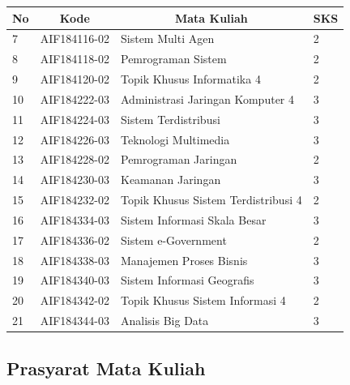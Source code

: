 \begin{table}[H]
	\centering
		\begin{tabular}{|p{0.5cm}|p{2.85cm}|p{4.95cm}|p{2.7cm}|}
			\hline
			\multicolumn{1}{|c|}{\textbf{No}} & \multicolumn{1}{c|}{\textbf{Kode}} & \multicolumn{1}{c|}{\textbf{Mata Kuliah}} & \multicolumn{1}{c|}{\textbf{SKS}} \\ \hline
7   & AIF184116-02    & Sistem Multi Agen                          & 2   \\ \hline
8   & AIF184118-02    & Pemrograman Sistem                         & 2   \\ \hline
9   & AIF184120-02    & Topik Khusus Informatika 4                 & 2   \\ \hline
10  & AIF184222-03    & Administrasi Jaringan Komputer 4           & 3   \\ \hline
11  & AIF184224-03    & Sistem Terdistribusi                       & 3   \\ \hline
12  & AIF184226-03    & Teknologi Multimedia                       & 3   \\ \hline
13  & AIF184228-02    & Pemrograman Jaringan                       & 2   \\ \hline
14  & AIF184230-03    & Keamanan Jaringan                          & 3   \\ \hline
15  & AIF184232-02    & Topik Khusus Sistem Terdistribusi 4        & 2   \\ \hline
16  & AIF184334-03    & Sistem Informasi Skala Besar               & 3   \\ \hline
17  & AIF184336-02    & Sistem e-Government                        & 2   \\ \hline
18  & AIF184338-03    & Manajemen Proses Bisnis                    & 3   \\ \hline
19  & AIF184340-03    & Sistem Informasi Geografis                 & 3   \\ \hline
20  & AIF184342-02    & Topik Khusus Sistem Informasi 4            & 2   \\ \hline
21  & AIF184344-03 & Analisis Big Data                          & 3   \\ \hline
		\end{tabular}
	\label{tab:kuliahpilihan_3}
\end{table}

\subsection{Prasyarat Mata Kuliah}

